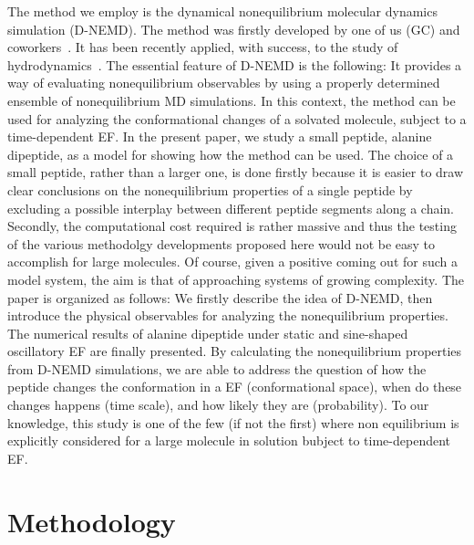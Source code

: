 \documentclass[a4paper,preprint,unsortedaddress,onecolumn]{revtex4-1}
\begin{document}
The method we employ is the dynamical nonequilibrium molecular dynamics simulation (D-NEMD).
The method was firstly developed by one of us (GC) and coworkers~\cite{ciccotti1975direct, ciccotti1979thought}.
It has been recently applied, with success, to the study of
hydrodynamics~\cite{orlandini2011hydrodynamics,
  orlandini2011hydrodynamics-01}. The essential feature of D-NEMD is the following: It provides a way of evaluating
nonequilibrium observables by using a properly determined ensemble of nonequilibrium MD
simulations.  In this context, the method can be used for analyzing the
conformational changes of a solvated molecule, subject to a time-dependent EF.
In the present paper, we study a small peptide, alanine dipeptide, as a model for showing how the method can be used. 
The choice of a small peptide, rather than a larger one, is done firstly because it
is easier to draw clear conclusions on the nonequilibrium properties
of a single peptide by excluding a possible interplay between
different peptide segments along a chain.
Secondly, the computational cost required is rather massive and thus the testing of the various methodolgy developments proposed here would not be easy to accomplish for large molecules. Of course, given a positive coming out for such a model system, the aim is that of approaching systems of growing complexity.
The paper is organized as follows:
We firstly describe the idea of D-NEMD, then
introduce the physical
observables for analyzing the nonequilibrium properties. The numerical results of alanine
dipeptide under static and sine-shaped oscillatory EF are
finally presented. By calculating the nonequilibrium properties from D-NEMD
simulations, we are able to address the question of how the peptide
changes the conformation in a EF (conformational space), when do these changes happens (time scale),
and how likely they are (probability). 
To our knowledge, this study is one of the few (if not the first)  where non equilibrium is explicitly considered for a large molecule in solution bubject to time-dependent EF.



\section{Methodology}
\end{document}
